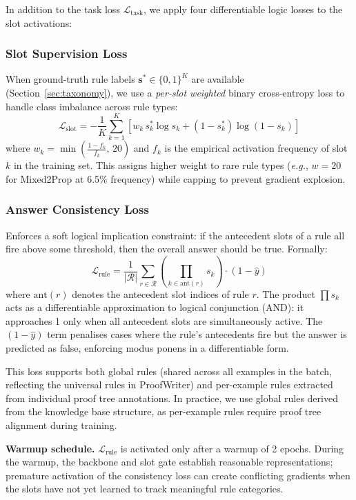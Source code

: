 \documentclass[conference]{IEEEtran}
\newcommand{\eg}{\textit{e.g.}}
\begin{document}
In addition to the task loss $\mathcal{L}_\text{task}$, we apply
four differentiable logic losses to the slot activations:

\subsubsection{Slot Supervision Loss}
When ground-truth rule labels $\mathbf{s}^* \in \{0,1\}^K$ are
available (Section~\ref{sec:taxonomy}), we use a
\emph{per-slot weighted} binary cross-entropy loss to handle
class imbalance across rule types:
\begin{equation}
    \mathcal{L}_\text{slot} = -\frac{1}{K}\sum_{k=1}^{K}
    \left[w_k\, s^*_k \log s_k + (1-s^*_k)\log(1-s_k)\right]
\end{equation}
where $w_k = \min\!\left(\frac{1-f_k}{f_k},\, 20\right)$ and
$f_k$ is the empirical activation frequency of slot~$k$ in the
training set.  This assigns higher weight to rare rule types
(\eg{}, $w=20$ for Mixed2Prop at 6.5\% frequency) while capping
to prevent gradient explosion.

\subsubsection{Answer Consistency Loss}
Enforces a soft logical implication constraint: if the antecedent
slots of a rule all fire above some threshold, then the overall
answer should be true.  Formally:
\begin{equation}
    \mathcal{L}_\text{rule} = \frac{1}{|\mathcal{R}|} \sum_{r \in \mathcal{R}}
    \left(\prod_{k \in \mathrm{ant}(r)} s_k\right) \cdot (1 - \hat{y})
\end{equation}
where $\mathrm{ant}(r)$ denotes the antecedent slot indices of
rule $r$.  The product $\prod s_k$ acts as a differentiable
approximation to logical conjunction (AND): it approaches 1 only
when all antecedent slots are simultaneously active.  The
$(1 - \hat{y})$ term penalises cases where the rule's antecedents
fire but the answer is predicted as false, enforcing modus ponens
in a differentiable form.

This loss supports both global rules (shared across all examples
in the batch, reflecting the universal rules in ProofWriter) and
per-example rules extracted from individual proof tree annotations.
In practice, we use global rules derived from the knowledge base
structure, as per-example rules require proof tree alignment during
training.

\textbf{Warmup schedule.}  $\mathcal{L}_\text{rule}$ is activated
only after a warmup of 2 epochs.  During the warmup, the backbone
and slot gate establish reasonable representations; premature
activation of the consistency loss can create conflicting gradients
when the slots have not yet learned to track meaningful rule
categories.
\end{document}
